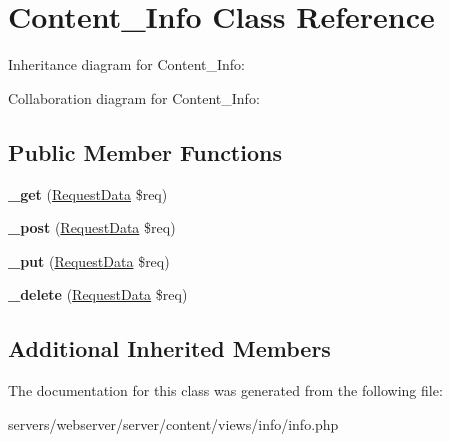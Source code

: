 \hypertarget{class_lora_1_1_content_1_1_content___info}{}\section{Content\+\_\+\+Info Class Reference}
\label{class_lora_1_1_content_1_1_content___info}


Inheritance diagram for Content\+\_\+\+Info\+:


Collaboration diagram for Content\+\_\+\+Info\+:
\subsection*{Public Member Functions}
\begin{DoxyCompactItemize}
\item 
\mbox{\label{class_lora_1_1_content_1_1_content___info_a3ad4bf1b146a3180b34d1327ff2abf69}} 
{\bfseries \+\_\+get} (\hyperlink{class_request_data}{Request\+Data} \$req)
\item 
\mbox{\label{class_lora_1_1_content_1_1_content___info_a50751d47a139282d1c3b08cab1b6562e}} 
{\bfseries \+\_\+post} (\hyperlink{class_request_data}{Request\+Data} \$req)
\item 
\mbox{\label{class_lora_1_1_content_1_1_content___info_a2affcc8f31c13147c33450193b229194}} 
{\bfseries \+\_\+put} (\hyperlink{class_request_data}{Request\+Data} \$req)
\item 
\mbox{\label{class_lora_1_1_content_1_1_content___info_ab8ddc6de1e04524212f7d55893f78864}} 
{\bfseries \+\_\+delete} (\hyperlink{class_request_data}{Request\+Data} \$req)
\end{DoxyCompactItemize}
\subsection*{Additional Inherited Members}


The documentation for this class was generated from the following file\+:\begin{DoxyCompactItemize}
\item 
servers/webserver/server/content/views/info/info.\+php\end{DoxyCompactItemize}
